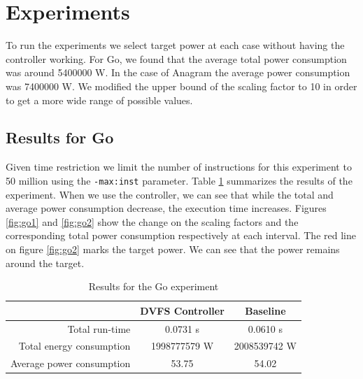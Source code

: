 \documentclass[10pt]{scrartcl}
\begin{document}

\FloatBarrier

\section{Experiments}
To run the experiments we select target power at each case without having the controller working. For Go, we found that the average total power consumption was around 5400000 W.  In the case of Anagram the average power consumption was 7400000 W.  We modified the upper bound of the scaling factor to 10 in order to get a more wide range of possible values.

\subsection{Results for Go}
Given time restriction we limit the number of instructions for this experiment to 50 million using the \texttt{-max:inst} parameter.  Table \ref{tab:go} summarizes the results of the experiment.  When we use the controller,  we can see that while the total and average power consumption decrease, the execution time increases.  Figures \ref{fig:go1} and \ref{fig:go2} show the change on the scaling factors and the corresponding total power consumption respectively at each interval.  The red line on figure \ref{fig:go2} marks the target power.  We can see that the power remains around the target.

\begin{table}[h!]
\centering
\begin{tabular}{rcc}
\toprule
& DVFS Controller & Baseline\\
\midrule
Total run-time & 0.0731 s & 0.0610 s \\
Total energy consumption & 1998777579 W & 2008539742 W \\
Average power consumption & 53.75 & 54.02 \\
\bottomrule
\end{tabular}
\caption{Results for the Go experiment}\label{tab:go}
\end{table}
\end{document}
